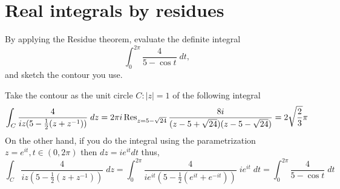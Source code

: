 \section{Real integrals by residues}\label{p:complex-integrals}

\begin{problem}
By applying the Residue theorem, evaluate the definite integral 
    \[ \int_0^{2\pi} \frac{4}{5-\cos t} \; dt, \]
    and sketch the contour you use.
\begin{solution}
Take the contour as the unit circle $C:|z|=1$ of the following integral 
    \[\int_C \frac{4}{iz(5-\frac12(z+z^{-1})) }\; dz= 2\pi i \operatorname{Res}_{z=5-\sqrt{24}} \frac{8i}{(z-5+\sqrt{24})(z-5-\sqrt{24})}=2 \sqrt{\frac23}\pi\]
    On the other hand, if you do the integral using the parametrization $z= e^{it}, t\in (0,2\pi)$ then $dz = ie^{it} dt$ thus,
    \[\int_C \frac{4}{iz(5-\frac12(z+z^{-1})) }\; dz=  \int_0^{2\pi} \frac{4}{ie^{it}(5-\frac12(e^{it}+e^{-it}))} \; ie^{it}\; dt = \int_0^{2\pi} \frac{4}{5-\cos t}\; dt\]
\end{solution}
\end{problem}

